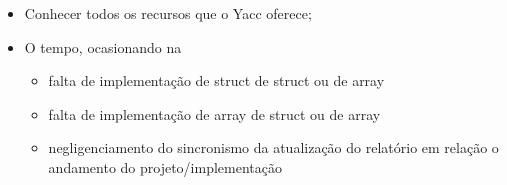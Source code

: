 \begin{itemize}
\item Conhecer todos os recursos que o Yacc oferece;
\item O tempo, ocasionando na
\begin{itemize}
	\item falta de implementação de struct de struct ou de array
	\item falta de implementação de array de struct ou de array
	\item negligenciamento do sincronismo da atualização do relatório em relação o andamento do projeto/implementação
\end{itemize}
\end{itemize}
